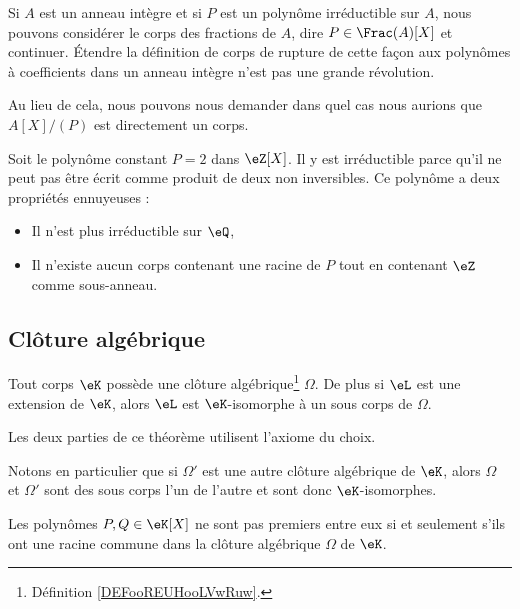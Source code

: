 Si \( A\) est un anneau intègre et si \( P\) est un polynôme irréductible sur \( A\), nous pouvons considérer le corps des fractions de \( A\), dire \( P\in\Frac(A)[X]\) et continuer. Étendre la définition de corps de rupture de cette façon aux polynômes à coefficients dans un anneau intègre n'est pas une grande révolution.

Au lieu de cela, nous pouvons nous demander dans quel cas nous aurions que \( A[X]/(P)\) est directement un corps.

\begin{example}
    Soit le polynôme constant \( P=2\) dans \( \eZ[X]\). Il y est irréductible parce qu'il ne peut pas être écrit comme produit de deux non inversibles. Ce polynôme a deux propriétés ennuyeuses :
    \begin{itemize}
        \item Il n'est plus irréductible sur \( \eQ\),
        \item Il n'existe aucun corps contenant une racine de \( P\) tout en contenant \( \eZ\) comme sous-anneau.
    \end{itemize}
\end{example}

\subsection{Clôture algébrique}

\begin{theorem}     \label{THOooQFWWooMWXEhT}
    Tout corps \( \eK\) possède une clôture algébrique\footnote{Définition \ref{DEFooREUHooLVwRuw}.} \( \Omega\). De plus si \( \eL\) est une extension de \( \eK\), alors \( \eL\) est \( \eK\)-isomorphe à un sous corps de \( \Omega\).
\end{theorem}
Les deux parties de ce théorème utilisent l'axiome du choix.

Notons en particulier que si \( \Omega'\) est une autre clôture algébrique de \( \eK\), alors \( \Omega\) et \( \Omega'\) sont des sous corps l'un de l'autre et sont donc \( \eK\)-isomorphes.

\begin{lemma}
    Les polynômes \( P,Q\in \eK[X]\) ne sont pas premiers entre eux si et seulement s'ils ont une racine commune dans la clôture algébrique \( \Omega\) de \( \eK\).
\end{lemma}

